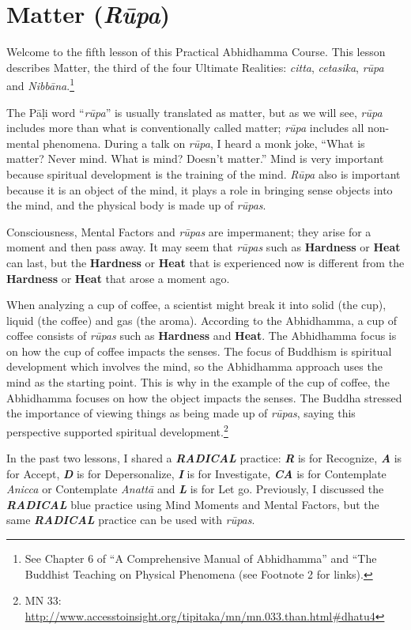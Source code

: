 \section{Matter (\textit{Rūpa})}

Welcome to the fifth lesson of this Practical Abhidhamma Course. This lesson describes Matter, the third of the four Ultimate Realities: \textit{citta}, \textit{cetasika}, \textit{rūpa} and \textit{Nibbāna}.\footnote{See Chapter 6 of “A Comprehensive Manual of Abhidhamma” and “The Buddhist Teaching on Physical Phenomena (see Footnote 2 for links).}

The Pāḷi word “\textit{rūpa}” is usually translated as matter, but as we will see, \textit{rūpa} includes more than what is conventionally called matter; \textit{rūpa} includes all non-mental phenomena. During a talk on \textit{rūpa}, I heard a monk joke, “What is matter? Never mind. What is mind? Doesn’t matter.” Mind is very important because spiritual development is the training of the mind. \textit{Rūpa} also is important because it is an object of the mind, it plays a role in bringing sense objects into the mind, and the physical body is made up of \textit{rūpas}.

Consciousness, Mental Factors and \textit{rūpas} are impermanent; they arise for a moment and then pass away. It may seem that \textit{rūpas} such as \textbf{Hardness} or \textbf{Heat} can last, but the \textbf{Hardness} or \textbf{Heat} that is experienced now is different from the \textbf{Hardness} or \textbf{Heat} that arose a moment ago.

When analyzing a cup of coffee, a scientist might break it into solid (the cup), liquid (the coffee) and gas (the aroma). According to the Abhidhamma, a cup of coffee consists of \textit{rūpas} such as \textbf{Hardness} and \textbf{Heat}. The Abhidhamma focus is on how the cup of coffee impacts the senses. The focus of Buddhism is spiritual development which involves the mind, so the Abhidhamma approach uses the mind as the starting point. This is why in the example of the cup of coffee, the Abhidhamma focuses on how the object impacts the senses. The Buddha stressed the importance of viewing things as being made up of \textit{rūpas}, saying this perspective supported spiritual development.\footnote{MN 33: \url{http://www.accesstoinsight.org/tipitaka/mn/mn.033.than.html\#dhatu4}}

In the past two lessons, I shared a \textbf{\textit{RADICAL}} practice: \textbf{\textit{R}} is for Recognize, \textbf{\textit{A}} is for Accept, \textbf{\textit{D}} is for Depersonalize, \textbf{\textit{I}} is for Investigate, \textbf{\textit{CA}} is for Contemplate \textit{Anicca} or Contemplate \textit{Anattā} and \textit{\textbf{L}} is for Let go. Previously, I discussed the \textbf{\textit{RADICAL}} blue practice using Mind Moments and Mental Factors, but the same \textbf{\textit{RADICAL}} practice can be used with \textit{rūpas}.

